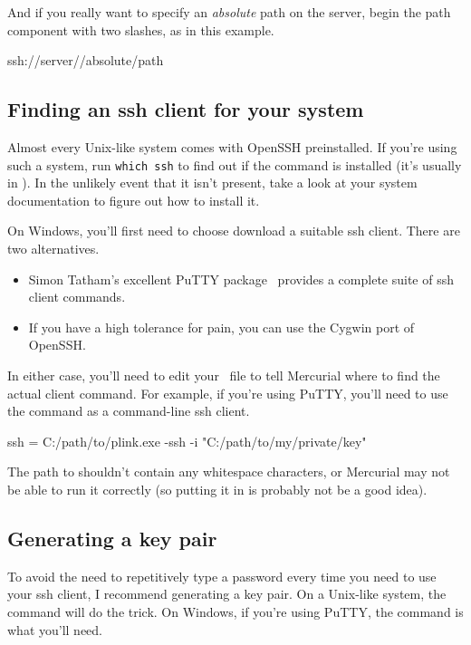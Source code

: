 And if you really want to specify an \emph{absolute} path on the
server, begin the path component with two slashes, as in this example.
\begin{codesample2}
  ssh://server//absolute/path
\end{codesample2}

\subsection{Finding an ssh client for your system}

Almost every Unix-like system comes with OpenSSH preinstalled.  If
you're using such a system, run \Verb|which ssh| to find out if
the  command is installed (it's usually in
).  In the unlikely event that it isn't present,
take a look at your system documentation to figure out how to install
it.

On Windows, you'll first need to choose download a suitable ssh
client.  There are two alternatives.
\begin{itemize}
\item Simon Tatham's excellent PuTTY package~\cite{web:putty} provides
  a complete suite of ssh client commands.
\item If you have a high tolerance for pain, you can use the Cygwin
  port of OpenSSH.
\end{itemize}
In either case, you'll need to edit your \hgini\ file to tell
Mercurial where to find the actual client command.  For example, if
you're using PuTTY, you'll need to use the  command as
a command-line ssh client.
\begin{codesample2}
  [ui]
  ssh = C:/path/to/plink.exe -ssh -i "C:/path/to/my/private/key"
\end{codesample2}

\begin{note}
  The path to  shouldn't contain any whitespace
  characters, or Mercurial may not be able to run it correctly (so
  putting it in  is probably not be a good
  idea).
\end{note}

\subsection{Generating a key pair}

To avoid the need to repetitively type a password every time you need
to use your ssh client, I recommend generating a key pair.  On a
Unix-like system, the  command will do the trick.
On Windows, if you're using PuTTY, the  command is
what you'll need.

